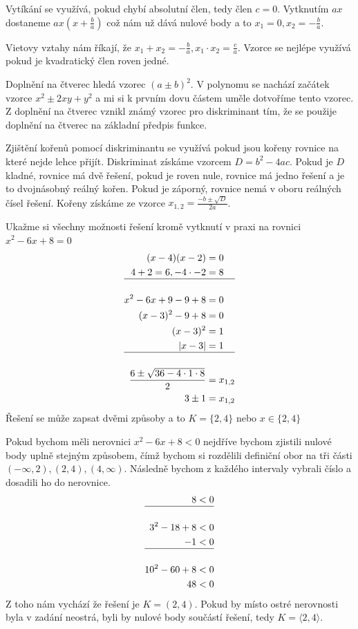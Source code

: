 \documentclass[12pt]{article}
\begin{document}
Vytíkání se využívá, pokud chybí absolutní člen, tedy člen $c = 0$. Vytknutím $ax$ dostaneme
$ax (x + \frac {b}{a})$ což nám už dává nulové body a to $x_1 = 0, x_2 = - \frac{b}{a}$.

Vietovy vztahy nám říkají, že $x_1 + x_2 = -\frac{b}{a}, x_1 \cdot x_2 = \frac{c}{a}$. Vzorce se
nejlépe využívá pokud je kvadratický člen roven jedné.

Doplnění na čtverec hledá vzorec $(a \pm b)^2$. V polynomu se nachází začátek vzorce $x^2 \pm 2xy +
y^2$ a mi si k prvním dovu částem uměle dotvoříme tento vzorec. Z doplnění na čtverec vznikl známý
vzorec pro diskriminant tím, že se použije doplnění na čtverec na základní předpis funkce.

Zjištění kořenů pomocí diskriminantu se využívá pokud jsou kořeny rovnice na které nejde lehce přijít.
Diskriminat získáme vzorcem $D = b^2 - 4ac$. Pokud je $D$ kladné, rovnice má dvě řešení, pokud je
roven nule, rovnice má jedno řešení a je to dvojnásobný reálný kořen. Pokud je záporný, rovnice nemá
v oboru reálných čísel řešení. Kořeny získáme ze vzorce $x_{1,2} = \frac{-b \pm \sqrt{D}}{2a}$.

Ukažme si všechny možnosti řešení kromě vytknutí v praxi na rovnici $x^2 - 6x + 8 = 0$
\[
\begin{aligned}
    (x - 4)(x - 2) &= 0 \\
    4 + 2 = 6, -4 \cdot -2 &= 8 \\
    \hline \\
    x^2 -6x +9 -9 +8 &= 0 \\
    (x - 3)^2 -9 + 8 &= 0 \\
    (x - 3)^2 &= 1 \\
    |x - 3| &= 1 \\
    \hline \\
    \frac{6 \pm \sqrt{36 - 4 \cdot 1 \cdot 8}}{2} &= x_{1,2} \\
    3 \pm 1 &= x_{1,2}
\end{aligned}
\]
Řešení se může zapsat dvěmi způsoby a to $K = \{2, 4\}$ nebo $x \in \{2, 4\}$

Pokud bychom měli nerovnici $x^2 - 6x + 8 < 0$ nejdříve bychom zjistili nulové body uplně stejným
způsobem, čímž bychom si rozdělili definiční obor na tři části $(-\infty, 2), (2, 4), (4, \infty)$.
Následně bychom z každého intervaly vybrali číslo a dosadili ho do nerovnice.
\[
\begin{aligned}
    8 &< 0 \\
    \hline \\
    3^2 - 18 + 8 &< 0 \\
    -1 &< 0 \\
    \hline \\
    10^2 - 60 + 8 &< 0 \\
    48 &< 0
\end{aligned}
\]
Z toho nám vychází že řešení je $K = (2, 4)$. Pokud by místo ostré nerovnosti byla v zadání neostrá,
byli by nulové body součástí řešení, tedy $K = \langle 2, 4 \rangle$.
\end{document}
